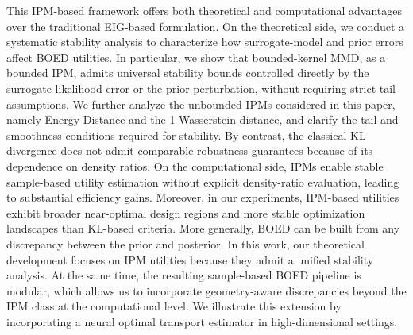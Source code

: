\documentclass[twoside,11pt]{article}
\begin{document}
This IPM-based framework offers both theoretical and computational advantages over the traditional EIG-based formulation. On the theoretical side, we conduct a systematic stability analysis to characterize how surrogate-model and prior errors affect BOED utilities. In particular, we show that bounded-kernel MMD, as a bounded IPM, admits universal stability bounds controlled directly by the surrogate likelihood error or the prior perturbation, without requiring strict tail assumptions. We further analyze the unbounded IPMs considered in this paper, namely Energy Distance and the 1-Wasserstein distance, and clarify the tail and smoothness conditions required for stability. By contrast, the classical KL divergence does not admit comparable robustness guarantees because of its dependence on density ratios. On the computational side, IPMs enable stable sample-based utility estimation without explicit density-ratio evaluation, leading to substantial efficiency gains. Moreover, in our experiments, IPM-based utilities exhibit broader near-optimal design regions and more stable optimization landscapes than KL-based criteria. More generally, BOED can be built from any discrepancy between the prior and posterior. In this work, our theoretical development focuses on IPM utilities because they admit a unified stability analysis. At the same time, the resulting sample-based BOED pipeline is modular, which allows us to incorporate geometry-aware discrepancies beyond the IPM class at the computational level. We illustrate this extension by incorporating a neural optimal transport estimator \citep{amos2017input} in high-dimensional settings.
\end{document}
